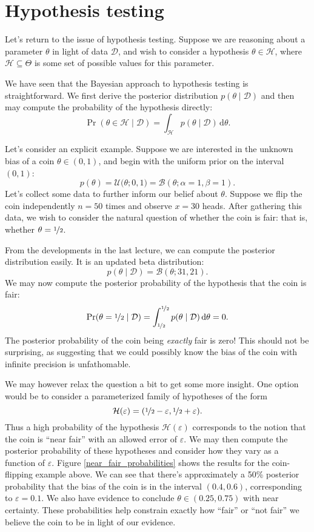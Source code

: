 \documentclass{article}
\newcommand{\given}{\mid}
\newcommand{\mc}[1]{\mathcal{#1}}
\newcommand{\data}{\mc{D}}
\newcommand{\intd}[1]{\,\mathrm{d}{#1}}
\begin{document}
\section*{Hypothesis testing}

Let's return to the issue of hypothesis testing. Suppose we are reasoning about
a parameter $\theta$ in light of data $\data$, and wish to consider a hypothesis
$\theta \in \mc{H}$, where $\mc{H} \subseteq \Theta$ is some set of possible
values for this parameter.

We have seen that the Bayesian approach to hypothesis testing is
straightforward. We first derive the posterior distribution $p(\theta \given
\data)$ and then may compute the probability of the hypothesis directly:
\[
  \Pr(\theta \in \mc{H} \given \data)
  =
  \int_{\mc{H}} p(\theta \given \data) \intd \theta.
\]

Let's consider an explicit example. Suppose we are interested in the unknown
bias of a coin $\theta \in (0, 1)$, and begin with the uniform prior on the
interval $(0, 1)$:
\[
  p(\theta) = \mc{U}\bigl(\theta; 0, 1\bigr)
            = \mc{B}(\theta; \alpha = 1, \beta = 1).
\]
Let's collect some data to further inform our belief about $\theta$. Suppose we
flip the coin independently $n = 50$ times and observe $x = 30$ heads. After
gathering this data, we wish to consider the natural question of whether the
coin is fair: that is, whether $\theta = \nicefrac{1}{2}$.

From the developments in the last lecture, we can compute the posterior
distribution easily. It is an updated beta distribution:
\[
  p(\theta \given \data) = \mc{B}(\theta; 31, 21).
\]
We may now compute the posterior probability of the hypothesis that the coin is
fair:
\[
  \Pr(\theta = \nicefrac{1}{2} \given \data)
  =
  \int_{\nicefrac{1}{2}}^{\nicefrac{1}{2}}
  p(\theta \given \data)
  \intd\theta
  =
  0.
\]
The posterior probability of the coin being \emph{exactly} fair is zero! This
should not be surprising, as suggesting that we could possibly know the bias of
the coin with infinite precision is unfathomable.

We may however relax the question a bit to get some more insight. One option
would be to consider a parameterized family of hypotheses of the form
\[
  \mc{H}(\varepsilon) = (\nicefrac{1}{2} - \varepsilon, \nicefrac{1}{2} + \varepsilon).
\]
Thus a high probability of the hypothesis $\mc{H}(\varepsilon)$ corresponds to
the notion that the coin is ``near fair'' with an allowed error of
$\varepsilon$. We may then compute the posterior probability of these hypotheses
and consider how they vary as a function of $\varepsilon$. Figure
\ref{near_fair_probabilities} shows the results for the coin-flipping example
above. We can see that there's approximately a 50\% posterior probability that
the bias of the coin is in the interval $(0.4, 0.6)$, corresponding to
$\varepsilon = 0.1$. We also have evidence to conclude $\theta \in (0.25, 0.75)$
with near certainty. These probabilities help constrain exactly how ``fair'' or
``not fair'' we believe the coin to be in light of our evidence.
\end{document}
